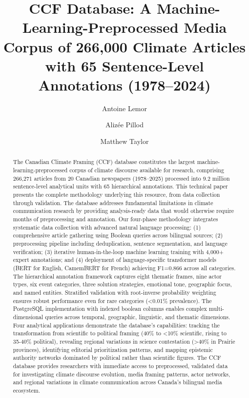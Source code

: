 \documentclass[12pt]{article}
\title{\textbf{CCF Database: A Machine-Learning-Preprocessed Media Corpus of 266,000 Climate Articles with 65 Sentence-Level Annotations (1978–2024)}}
\author[1]{Antoine Lemor}
\author[2]{Alizée Pillod}
\author[2]{Matthew Taylor}
\affil[1]{Université de Sherbrooke}
\affil[2]{Université de Montréal}
\date{}
\begin{document}
\maketitle
\thispagestyle{empty}


\begin{abstract}
\noindent
The Canadian Climate Framing (CCF) database constitutes the largest machine-learning-preprocessed corpus of climate discourse available for research, comprising 266,271 articles from 20 Canadian newspapers (1978–2025) processed into 9.2 million sentence-level analytical units with 65 hierarchical annotations. This technical paper presents the complete methodology underlying this resource, from data collection through validation. The database addresses fundamental limitations in climate communication research by providing analysis-ready data that would otherwise require months of preprocessing and annotation. Our four-phase methodology integrates systematic data collection with advanced natural language processing: (1) comprehensive article gathering using Boolean queries across bilingual sources; (2) preprocessing pipeline including deduplication, sentence segmentation, and language verification; (3) iterative human-in-the-loop machine learning training with 4,000+ expert annotations; and (4) deployment of language-specific transformer models (BERT for English, CamemBERT for French) achieving F1=0.866 across all categories. The hierarchical annotation framework captures eight thematic frames, nine actor types, six event categories, three solution strategies, emotional tone, geographic focus, and named entities. Stratified validation with root-inverse probability weighting ensures robust performance even for rare categories (<0.01\% prevalence). The PostgreSQL implementation with indexed boolean columns enables complex multi-dimensional queries across temporal, geographic, linguistic, and thematic dimensions. Four analytical applications demonstrate the database's capabilities: tracking the transformation from scientific to political framing (40\% to <10\% scientific, rising to 35-40\% political), revealing regional variations in science contestation (>40\% in Prairie provinces), identifying editorial prioritization patterns, and mapping epistemic authority networks dominated by political rather than scientific figures. The CCF database provides researchers with immediate access to preprocessed, validated data for investigating climate discourse evolution, media framing patterns, actor networks, and regional variations in climate communication across Canada's bilingual media ecosystem.
\end{abstract}
\end{document}
